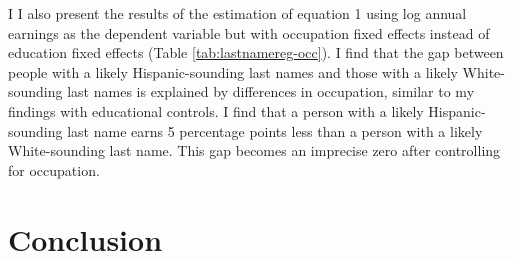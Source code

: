 I I also present the results of the estimation of equation 1 using log annual earnings as the dependent variable but with occupation fixed effects instead of education fixed effects (Table \ref{tab:lastnamereg-occ}). I find that the gap between people with a likely Hispanic-sounding last names and those with a likely White-sounding last names is explained by differences in occupation, similar to my findings with educational controls. I find that a person with a likely Hispanic-sounding last name earns 5 percentage points less than a person with a likely White-sounding last name. This gap becomes an imprecise zero after controlling for occupation.


\section{Conclusion}\label{sec:con1}

